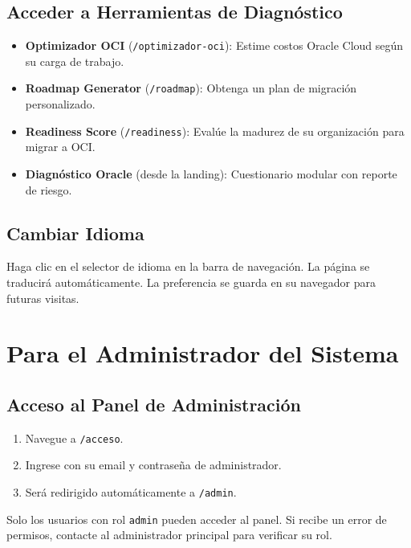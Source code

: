 \documentclass[12pt, a4paper, twoside]{report}
\begin{document}
\subsection{Acceder a Herramientas de Diagnóstico}

\begin{itemize}
  \item \textbf{Optimizador OCI} (\texttt{/optimizador-oci}): Estime costos Oracle Cloud
        según su carga de trabajo.
  \item \textbf{Roadmap Generator} (\texttt{/roadmap}): Obtenga un plan de migración
        personalizado.
  \item \textbf{Readiness Score} (\texttt{/readiness}): Evalúe la madurez de su organización
        para migrar a OCI.
  \item \textbf{Diagnóstico Oracle} (desde la landing): Cuestionario modular con reporte de
        riesgo.
\end{itemize}

\subsection{Cambiar Idioma}

Haga clic en el selector de idioma en la barra de navegación. La página se traducirá
automáticamente. La preferencia se guarda en su navegador para futuras visitas.

\section{Para el Administrador del Sistema}

\subsection{Acceso al Panel de Administración}

\begin{enumerate}
  \item Navegue a \texttt{/acceso}.
  \item Ingrese con su email y contraseña de administrador.
  \item Será redirigido automáticamente a \texttt{/admin}.
\end{enumerate}

\begin{tcolorbox}[warnbox]
  Solo los usuarios con rol \texttt{admin} pueden acceder al panel. Si recibe un error de
  permisos, contacte al administrador principal para verificar su rol.
\end{tcolorbox}
\end{document}
